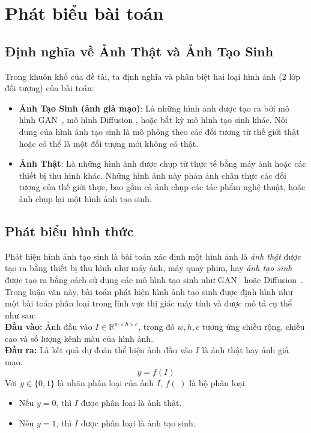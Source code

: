 \section{Phát biểu bài toán}
%
\subsection{Định nghĩa về Ảnh Thật và Ảnh Tạo Sinh}
Trong khuôn khổ của đề tài, ta định nghĩa và phân biệt hai loại hình ảnh (2 lớp đối tượng) của bài toán:
\begin{itemize}  

    \item \textbf{Ảnh Tạo Sinh (ảnh giả mạo)}: Là những hình ảnh được tạo ra bởi mô hình GAN~\cite{Goodfellow2014GenerativeAN}, mô hình Diffusion \cite{Ho2020DenoisingDP}, hoặc bất kỳ mô hình tạo sinh khác. Nôi dung của hình ảnh tạo sinh là mô phỏng theo các đối tượng từ thế giới thật hoặc có thể là một đối tượng mới không có thật.
    
    \item \textbf{Ảnh Thật}: Là những hình ảnh được chụp từ thực tế bằng máy ảnh hoặc các thiết bị thu hình khác. Những hình ảnh này phản ảnh chân thực các đối tượng của thế giới thực, bao gồm cả ảnh chụp các tác phẩm nghệ thuật, hoặc ảnh chụp lại một hình ảnh tạo sinh.

\end{itemize}
%
\subsection{Phát biểu hình thức}
%
Phát hiện hình ảnh tạo sinh là bài toán xác định một hình ảnh là \textit{ảnh thật} được tạo ra bằng thiết bị thu hình như máy ảnh, máy quay phim, hay \textit{ảnh tạo sinh} được tạo ra bằng cách sử dụng các mô hình tạo sinh như GAN~\cite{Goodfellow2014GenerativeAN} hoặc Diffusion~\cite{Ho2020DenoisingDP}. Trong luận văn này, bài toán phát hiện hình ảnh tạo sinh được định hình như một bài toán phân loại trong lĩnh vực thị giác máy tính và được mô tả cụ thể như sau:\\
%
\textbf{Đầu vào:} Ảnh đầu vào $I \in \mathbb{R}^{w \times h \times c}$, trong đó $w ,h, c$ tương ứng chiều rộng, chiều cao và số lượng kênh màu của hình ảnh.\\
%
\textbf{Đầu ra: } Là kết quả dự đoán thể hiện ảnh đầu vào $I$ là ảnh thật hay ảnh giả mạo.
\begin{equation}
y = f(I)
\end{equation}
Với  \( y \in \{0, 1\} \) là nhãn phân loại của ảnh \( I \), $f(.)$ là bộ phân loại.
\begin{itemize}
    \item Nếu \( y = 0 \), thì \( I \) được phân loại là ảnh thật.
    \item Nếu \( y = 1 \), thì \( I \) được phân loại là ảnh tạo sinh.
\end{itemize}
%
%
